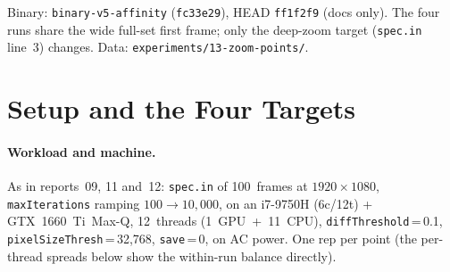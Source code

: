 \documentclass[
	english,
	letterpaper, oneside
]{article}
\begin{document}
\templatePagecfg
\templateFinalcfg

\inserttitle

\begin{center}\small\textsf{%
Binary: \texttt{binary-v5-affinity} (\texttt{fc33e29}), HEAD \texttt{ff1f2f9}
(docs only). The four runs share the wide full-set first frame; only the
deep-zoom target (\texttt{spec.in} line~3) changes. Data:
\texttt{experiments/13-zoom-points/}.%
}\end{center}

\begin{abstract}
Every prior report measured one zoom target --- the canonical minibrot at
$c\approx(0.0016,-0.8225)$. This report profiles the current best binary (GPU
affinity, report~\texttt{12-gpu-affinity.tex}) on four qualitatively
different targets: fully outside the set, fully inside the main cardioid, and
two boundary points distinct from the canonical one. The same wide first frame
and \texttt{maxIter} ramp are used; only the deep target differs. The headline
is a paradox: end-to-end cost spans 32$\times$ (2.37~s to 76.3~s) from
the same binary and parameters, yet the per-thread CPU spread stays under
1.4\,\% in every regime --- the dynamic queue is not the bottleneck
anywhere. The binding resource instead shifts: light regimes are
trivially CPU-bound, heavy ones are GPU-saturated (95--96\,\%). The
most useful new finding is the seahorse point, which reproduces the interior
outlier eightfold, and all eight are \texttt{cardioidBulb}=1
main-cardioid interiors that overflow to the CPU because the GPU is saturated
--- exactly the case the cheap cardioid certificate would fix, unlike the
canonical minibrot (\texttt{cardioidBulb}=0). The outliers never bind the wall:
the schedule is throughput-bound.
\end{abstract}

\section{Setup and the Four Targets}

\paragraph{Workload and machine.} As in reports~09, 11 and~12: \texttt{spec.in}
of 100~frames at $1920\times1080$, \texttt{maxIterations} ramping $100\to10{,}000$,
on an i7-9750H (6c/12t) + GTX~1660~Ti~Max-Q, 12~threads (1~GPU~+~11~CPU),
\texttt{diffThreshold}\,=\,0.1, \texttt{pixelSizeThresh}\,=\,32{,}768,
\texttt{save}\,=\,0, on AC power. One rep per point (the per-thread spreads below
show the within-run balance directly).
\end{document}
